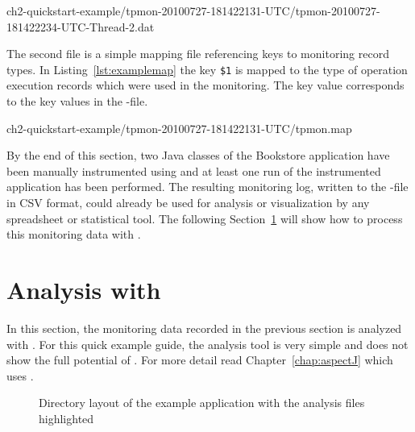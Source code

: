 \setBashListing
%
{ch2-quickstart-example/tpmon-20100727-181422131-UTC/tpmon-20100727-181422234-UTC-Thread-2.dat}

\noindent The second file is a simple mapping file referencing keys to monitoring record types. In Listing~\ref{lst:examplemap} the key \verb!$1! is mapped to the type of operation execution records which were used in the monitoring. The key value corresponds to the key values in the -file.

%
{ch2-quickstart-example/tpmon-20100727-181422131-UTC/tpmon.map}

\noindent By the end of this section, two Java classes of the Bookstore application %
have been manually instrumented using \KiekerMonitoringPart{} and at least one %
run of the instrumented application has been performed. %
The resulting monitoring log, written to the -file in CSV format, could %
already be used for analysis or visualization by any spreadsheet or %
statistical tool. %
The following Section~\ref{sec:example:analysis} will show how to process %
this monitoring data with \KiekerAnalysisPart{}. 

\section{Analysis with \KiekerAnalysisPart{}}\label{sec:example:analysis}

In this section, the monitoring data recorded in the previous section is %
analyzed with \KiekerAnalysisPart{}. %
For this quick example guide, the analysis tool is very simple and does not show %
the full potential of \Kieker{}. For more detail read Chapter~\ref{chap:aspectJ} %
which uses \KiekerTraceAnalysis{}.

\begin{figure}[H]
\begin{graybox}
\end{graybox}
\caption{Directory layout of the example application with the analysis files highlighted}
\label{lst:analysisExampleLayout}
\end{figure}

